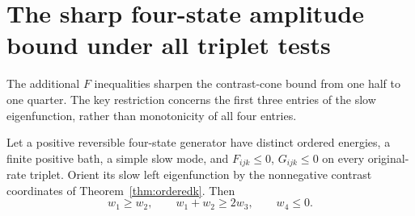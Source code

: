 \section{The sharp four-state amplitude bound under all triplet tests}
\label{sec:fulltripletbound}
The additional $F$ inequalities sharpen the contrast-cone bound from one
half to one quarter. The key restriction concerns the first three entries
of the slow eigenfunction, rather than monotonicity of all four entries.

\begin{lemma}\label{lem:firstthreearithmetic}
Let a positive reversible four-state generator have distinct ordered
energies, a finite positive bath, a simple slow mode, and $F_{ijk}\leq0$,
$G_{ijk}\leq0$ on every original-rate triplet. Orient its slow left
eigenfunction by the nonnegative contrast coordinates of
Theorem~\ref{thm:orderedk}. Then
\[
w_1\geq w_2,\qquad w_1+w_2\geq2w_3,\qquad w_4\leq0.
\]
\end{lemma}
